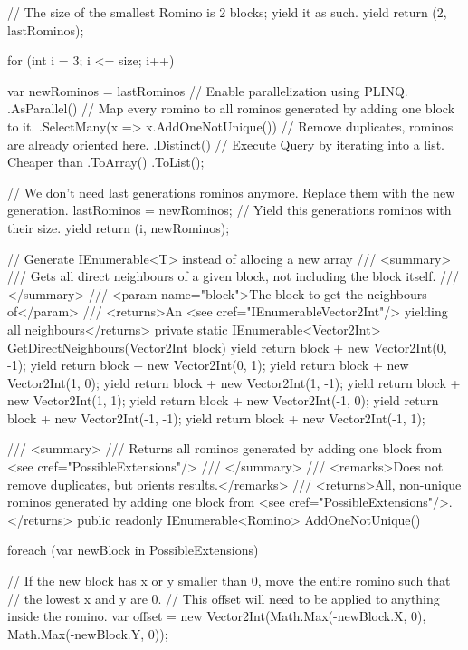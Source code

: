 \documentclass[a4paper,10pt,ngerman]{scrartcl}
\begin{document}
\begin{lstcs}
{{{            // The size of the smallest Romino is 2 blocks; yield it as such.
            yield return (2, lastRominos);

            for (int i = 3; i <= size; i++)
            {
                var newRominos = lastRominos
                    // Enable parallelization using PLINQ.
                    .AsParallel()
                    // Map every romino to all rominos generated by adding one block to it.
                    .SelectMany(x => x.AddOneNotUnique())
                    // Remove duplicates, rominos are already oriented here.
                    .Distinct()
                    // Execute Query by iterating into a list. Cheaper than .ToArray()
                    .ToList();

                // We don't need last generations rominos anymore. Replace them with the new generation.
                lastRominos = newRominos;
                // Yield this generations rominos with their size.
                yield return (i, newRominos);
            }
        }
    }

    // Generate IEnumerable<T> instead of allocing a new array
    /// <summary>
    /// Gets all direct neighbours of a given block, not including the block itself.
    /// </summary>
    /// <param name="block">The block to get the neighbours of</param>
    /// <returns>An <see cref="IEnumerable{Vector2Int}"/> yielding all neighbours</returns>
    private static IEnumerable<Vector2Int> GetDirectNeighbours(Vector2Int block)
    {
        yield return block + new Vector2Int(0, -1);
        yield return block + new Vector2Int(0, 1);
        yield return block + new Vector2Int(1, 0);
        yield return block + new Vector2Int(1, -1);
        yield return block + new Vector2Int(1, 1);
        yield return block + new Vector2Int(-1, 0);
        yield return block + new Vector2Int(-1, -1);
        yield return block + new Vector2Int(-1, 1);
    }

    /// <summary>
    /// Returns all rominos generated by adding one block from <see cref="PossibleExtensions"/>
    /// </summary>
    /// <remarks>Does not remove duplicates, but orients results.</remarks>
    /// <returns>All, non-unique rominos generated by adding one block from <see cref="PossibleExtensions"/>.</returns>
    public readonly IEnumerable<Romino> AddOneNotUnique()
    {
        foreach (var newBlock in PossibleExtensions)
        {
            // If the new block has x or y smaller than 0, move the entire romino such that
            // the lowest x and y are 0.
            // This offset will need to be applied to anything inside the romino.
            var offset = new Vector2Int(Math.Max(-newBlock.X, 0), Math.Max(-newBlock.Y, 0));

}}}
\end{lstcs}
\end{document}
